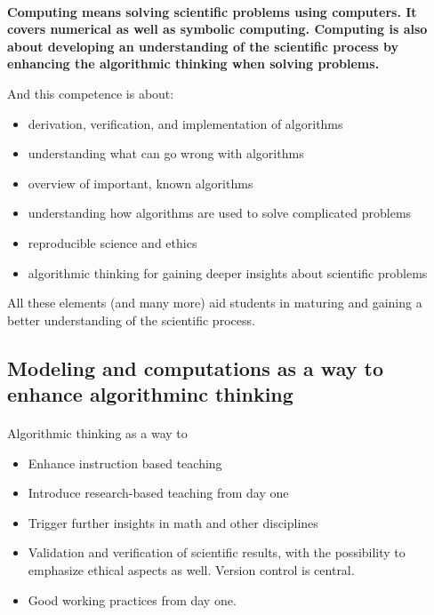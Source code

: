 \documentclass[%
oneside,                 %
final,                   %
10pt]{article}
\begin{document}
\paragraph{}

\textbf{Computing means solving scientific problems using computers. It covers numerical as well as symbolic computing. Computing is also about developing an understanding of the scientific process by enhancing the algorithmic thinking when solving problems.}

And this  competence is about:

\begin{itemize}
\item derivation, verification, and implementation of algorithms

\item understanding what can go wrong with algorithms

\item overview of important, known algorithms

\item understanding how algorithms are used to solve complicated problems

\item reproducible science and ethics

\item algorithmic thinking for gaining deeper insights about scientific problems
\end{itemize}

\noindent
All these elements (and many more) aid students in maturing and gaining a better understanding of the scientific process.




\subsection{Modeling and computations as a way to enhance algorithminc thinking}

\paragraph{}

Algorithmic  thinking as a way to

\begin{itemize}
\item Enhance instruction based teaching

\item Introduce research-based teaching  from day one

\item Trigger further insights in math and other disciplines 

\item Validation and verification of scientific results, with the possibility to emphasize ethical aspects as well. Version control is central.

\item Good working practices from day one.
\end{itemize}
\end{document}
